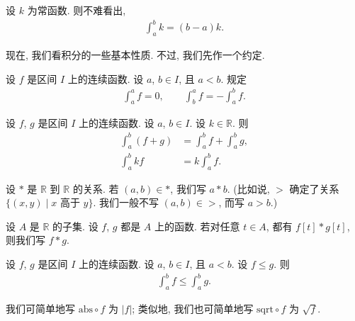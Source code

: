 \begin{example}
    设 $k$ 为常函数. 则不难看出,
    \begin{align*}
        \int_{a}^{b} {k} = (b - a)k.
    \end{align*}
\end{example}

现在, 我们看积分的一些基本性质. 不过, 我们先作一个约定.

\begin{definition}
    设 $f$ 是区间 $I$ 上的连续函数. 设 $a$, $b \in I$, 且 $a < b$. 规定
    \begin{align*}
        \int_{a}^{a} {f} = 0, \qquad \int_{b}^{a} {f} = -\int_{a}^{b} {f}.
    \end{align*}
\end{definition}

\begin{theorem}
    设 $f$, $g$ 是区间 $I$ 上的连续函数. 设 $a$, $b \in I$. 设 $k \in \mathbb{R}$. 则
    \begin{align*}
        \int_{a}^{b} {(f + g)} & = \int_{a}^{b} {f} + \int_{a}^{b} {g}, \\
        \int_{a}^{b} {kf}      & = k \int_{a}^{b} {f}.
    \end{align*}
\end{theorem}

\begin{definition}
    设 $\ast$ 是 $\mathbb{R}$ 到 $\mathbb{R}$ 的关系. 若 $(a, b) \in {\ast}$, 我们写 $a \ast b$. (比如说, $>$ 确定了关系 $\{ (x, y) \mid \text{$x$ 高于 $y$} \}$. 我们一般不写 $(a, b) \in {>}$, 而写 $a > b$.)

    设 $A$ 是 $\mathbb{R}$ 的子集. 设 $f$, $g$ 都是 $A$ 上的函数. 若对任意 $t \in A$, 都有 $f[t] \ast g[t]$, 则我们写 $f \ast g$.
\end{definition}

\begin{theorem}
    设 $f$, $g$ 是区间 $I$ 上的连续函数. 设 $a$, $b \in I$, 且 $a < b$. 设 $f \leq g$. 则
    \begin{align*}
        \int_{a}^{b} {f} \leq \int_{a}^{b} {g}.
    \end{align*}
\end{theorem}

\begin{definition}
    我们可简单地写 $\mathrm{abs} \circ f$ 为 $|f|$; 类似地, 我们也可简单地写 $\mathrm{sqrt} \circ f$ 为 $\sqrt{f}$.
\end{definition}

